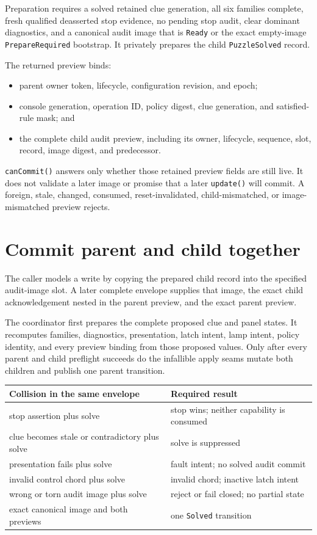 \documentclass[10pt]{article}
\begin{document}
Preparation requires a solved retained clue generation, all six families
complete, fresh qualified deasserted stop evidence, no pending stop audit,
clear dominant diagnostics, and a canonical audit image that is
\texttt{Ready} or the exact empty-image \texttt{PrepareRequired} bootstrap.
It privately prepares the child \texttt{PuzzleSolved} record.

The returned preview binds:

\begin{itemize}
 \item parent owner token, lifecycle, configuration revision, and epoch;
 \item console generation, operation ID, policy digest, clue generation, and
       satisfied-rule mask; and
 \item the complete child audit preview, including its owner, lifecycle,
       sequence, slot, record, image digest, and predecessor.
\end{itemize}

\texttt{canCommit()} answers only whether those retained preview fields are
still live. It does not validate a later image or promise that a later
\texttt{update()} will commit. A foreign, stale, changed, consumed,
reset-invalidated, child-mismatched, or image-mismatched preview rejects.

\section{Commit parent and child together}
The caller models a write by copying the prepared child record into the
specified audit-image slot. A later complete envelope supplies that image,
the exact child acknowledgement nested in the parent preview, and the exact
parent preview.

The coordinator first prepares the complete proposed clue and panel states.
It recomputes families, diagnostics, presentation, latch intent, lamp intent,
policy identity, and every preview binding from those proposed values. Only
after every parent and child preflight succeeds do the infallible apply seams
mutate both children and publish one parent transition.

\begin{tabularx}{\linewidth}{@{}l X@{}}
\toprule
Collision in the same envelope & Required result\\
\midrule
stop assertion plus solve & stop wins; neither capability is consumed\\
clue becomes stale or contradictory plus solve & solve is suppressed\\
presentation fails plus solve & fault intent; no solved audit commit\\
invalid control chord plus solve & invalid chord; inactive latch intent\\
wrong or torn audit image plus solve & reject or fail closed; no partial state\\
exact canonical image and both previews & one \texttt{Solved} transition\\
\bottomrule
\end{tabularx}
\end{document}
